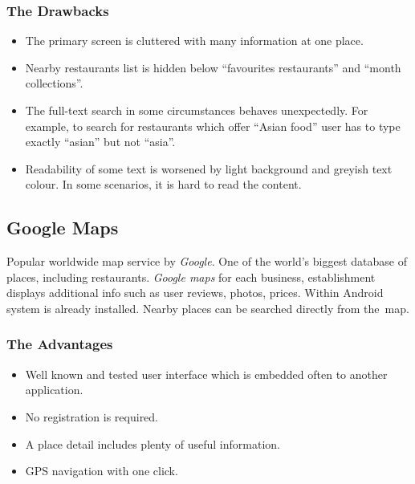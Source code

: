 \subsubsection{The Drawbacks}
\begin{itemize}
    \item The primary screen is cluttered with many information at one place.
    \item Nearby restaurants list is hidden below ``favourites restaurants'' and ``month collections''.
    \item The full-text search in some circumstances behaves unexpectedly. For example, to search for restaurants which offer ``Asian food'' user has to type exactly ``asian'' but not ``asia''.
    \item Readability of some text is worsened by light background and greyish text colour. In some scenarios, it is hard to read the content.
\end{itemize}

\subsection{Google Maps}
Popular worldwide map service by \textit{Google}. One of the world's biggest database of places, including restaurants. 
\textit{Google maps} for each business, establishment displays additional info such as user reviews, photos, prices. 
Within Android system is already installed. Nearby places can be searched directly from the~map.


\subsubsection{The Advantages}
\begin{itemize}
    \item Well known and tested user interface which is embedded often to another application.
    \item No registration is required.
    \item A place detail includes plenty of useful information.
    \item GPS navigation with one click.
\end{itemize}

